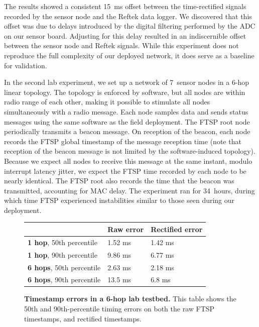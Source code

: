 The results showed a consistent 15~ms offset between the time-rectified
signals recorded by the sensor node and the Reftek data logger.  We
discovered that this offset was due to delays introduced by the digital
filtering performed by the ADC on our sensor board. Adjusting for this delay
resulted in an indiscernible offset between the sensor node and Reftek
signals. While this experiment does not reproduce the full complexity of our
deployed network, it does serve as a baseline for validation.

In the second lab experiment, we set up a network of 7~sensor nodes in a
6-hop linear topology. The topology is enforced by software, but all nodes
are within radio range of each other, making it possible to stimulate all
nodes simultaneously with a radio message.  Each node samples data and sends
status messages using the same software as the field deployment. The FTSP
root node periodically transmits a beacon message. On reception of the
beacon, each node records the FTSP global timestamp of the message reception
time (note that reception of the beacon message is not limited by the
software-induced topology).  Because we expect all nodes to receive this
message at the same instant, modulo interrupt latency jitter, we expect the
FTSP time recorded by each node to be nearly identical. The FTSP root also
records the time that the beacon was transmitted, accounting for MAC delay.
The experiment ran for 34~hours, during which time FTSP experienced
instabilities similar to those seen during our deployment.

\begin{figure}[t]
\begin{center}
\begin{tabular}{|lll|} \hline
                  & {\bf Raw error} & {\bf Rectified error} \\ \hline
{\bf  1 hop}, 50th percentile & 1.52 ms & 1.42 ms \\ 
{\bf 1 hop}, 90th percentile & 9.86 ms & 6.77 ms \\ \hline 
{\bf 6 hops}, 50th percentile & 2.63 ms & 2.18 ms \\ 
{\bf 6 hops}, 90th percentile & 13.5 ms & 6.8 ms \\ \hline 
\end{tabular}
\end{center}
\caption{\textbf{Timestamp errors in a 6-hop lab testbed.}
This table shows the 50th and 90th-percentile timing errors on both the raw
FTSP timestamps, and rectified timestamps.}
\label{evaluation-fig-time-rect-lab}
\end{figure}

